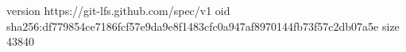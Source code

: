 version https://git-lfs.github.com/spec/v1
oid sha256:df779854ce7186fcf57e9da9e8f1483cfc0a947af8970144fb73f57c2db07a5e
size 43840
